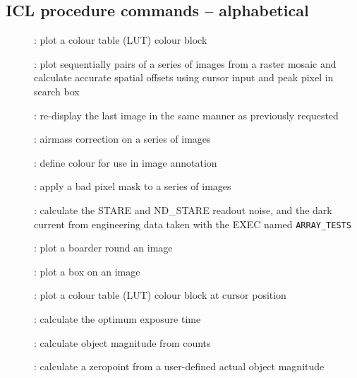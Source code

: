 
\subsection{\label{ss:icl_procedure_commands_alpha}ICL procedure commands -- alphabetical}

\begin{description}

\item []: plot a colour table (LUT) colour block

\item []: plot sequentially pairs of a series
of images from a raster mosaic and calculate accurate spatial offsets
using cursor input and peak pixel in search box

\item []: re-display the last image in the same
manner as previously requested

\item []: airmass correction on a series
of images

\item []: define colour for use in image annotation

\item []: apply a bad pixel mask to
a series of images

\item []: calculate the STARE and
ND\_STARE readout noise, and the dark current from engineering data
taken with the EXEC named {\tt ARRAY\_TESTS}

\item []: plot a boarder round an image

\item []: plot a box on an image

\item []: plot a colour table (LUT) colour
block at cursor position

\item []: calculate the optimum exposure time

\item []: calculate object magnitude from counts

\item []: calculate a zeropoint from a
user-defined actual object magnitude


\end{description}
